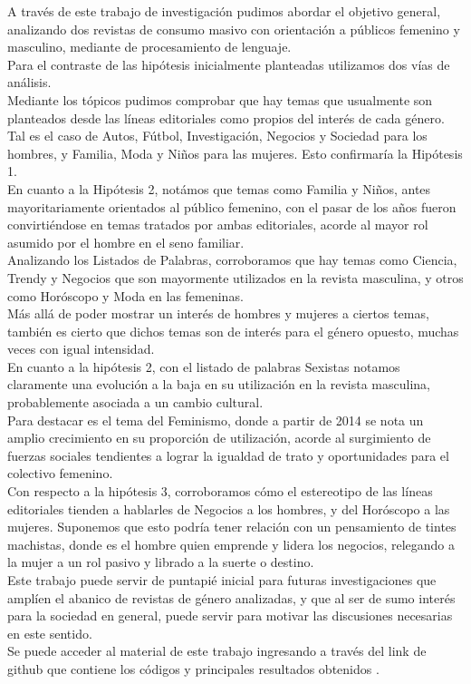 \documentclass[a4paper]{article}
\begin{document}
A trav\'es de este trabajo de investigaci\'on pudimos abordar el objetivo general, analizando dos revistas de consumo masivo con orientaci\'on a p\'ublicos femenino y masculino, mediante de procesamiento de lenguaje.\\

Para el contraste de las hip\'otesis inicialmente planteadas utilizamos dos v\'ias de an\'alisis.\\
Mediante los t\'opicos pudimos comprobar que hay temas que usualmente son planteados desde las l\'ineas editoriales como propios del inter\'es de cada g\'enero. Tal es el caso de Autos, F\'utbol, Investigaci\'on, Negocios y Sociedad para los hombres, y Familia, Moda y Ni\~nos para las mujeres. Esto confirmar\'ia la Hip\'otesis 1.\\
En cuanto a la Hip\'otesis 2, not\'amos que temas como Familia y Ni\~nos, antes mayoritariamente orientados al p\'ublico femenino, con el pasar de los a\~nos fueron convirti\'endose en temas tratados por ambas editoriales, acorde al mayor rol asumido por el hombre en el seno familiar.\\
\linebreak
Analizando los Listados de Palabras, corroboramos que hay temas como Ciencia, Trendy y Negocios que son mayormente utilizados en la revista masculina, y otros como Hor\'oscopo y Moda en las femeninas.\\ M\'as all\'a de poder mostrar un inter\'es de hombres y mujeres a ciertos temas, tambi\'en es cierto que dichos temas son de inter\'es para el g\'enero opuesto, muchas veces con igual intensidad.\\
En cuanto a la hip\'otesis 2, con el listado de palabras Sexistas notamos claramente una evoluci\'on a la baja en su utilizaci\'on en la revista masculina, probablemente asociada a un cambio cultural.\\
Para destacar es el tema del Feminismo, donde a partir de 2014 se nota un amplio crecimiento en su proporci\'on de utilizaci\'on, acorde al surgimiento de fuerzas sociales tendientes a lograr la igualdad de trato y oportunidades para el colectivo femenino.\\
Con respecto a la hip\'otesis 3, corroboramos c\'omo el estereotipo de las l\'ineas editoriales tienden a hablarles de Negocios a los hombres, y del Hor\'oscopo a las mujeres. Suponemos que esto podr\'ia tener relaci\'on con un pensamiento de tintes machistas, donde es el hombre quien emprende y lidera los negocios, relegando a la mujer a un rol pasivo y librado a la suerte o destino.\\
Este trabajo puede servir de puntapi\'e inicial para futuras investigaciones que ampl\'ien el abanico de revistas de g\'enero analizadas, y que al ser de sumo inter\'es para la sociedad en general, puede servir para motivar las discusiones necesarias en este sentido.\\
\linebreak
Se puede acceder al material de este trabajo ingresando a trav\'es del link de github que contiene los c\'odigos y principales resultados obtenidos \cite{github}.




\end{document}
